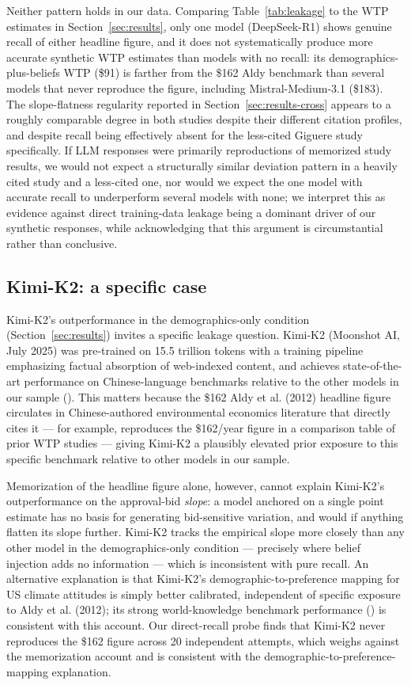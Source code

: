\documentclass[12pt]{article}
\begin{document}
Neither pattern holds in our data. Comparing Table~\ref{tab:leakage} to the WTP estimates in Section~\ref{sec:results}, only one model (DeepSeek-R1) shows genuine recall of either headline figure, and it does not systematically produce more accurate synthetic WTP estimates than models with no recall: its demographics-plus-beliefs WTP (\$91) is farther from the \$162 Aldy benchmark than several models that never reproduce the figure, including Mistral-Medium-3.1 (\$183). The slope-flatness regularity reported in Section~\ref{sec:results-cross} appears to a roughly comparable degree in both studies despite their different citation profiles, and despite recall being effectively absent for the less-cited Giguere study specifically. If LLM responses were primarily reproductions of memorized study results, we would not expect a structurally similar deviation pattern in a heavily cited study and a less-cited one, nor would we expect the one model with accurate recall to underperform several models with none; we interpret this as evidence against direct training-data leakage being a dominant driver of our synthetic responses, while acknowledging that this argument is circumstantial rather than conclusive.

\subsection{Kimi-K2: a specific case}

Kimi-K2's outperformance in the demographics-only condition (Section~\ref{sec:results}) invites a specific leakage question. Kimi-K2 (Moonshot AI, July 2025) was pre-trained on 15.5 trillion tokens with a training pipeline emphasizing factual absorption of web-indexed content, and achieves state-of-the-art performance on Chinese-language benchmarks relative to the other models in our sample (\textcite{KimiTeam2025}). This matters because the \$162 Aldy et al. (2012) headline figure circulates in Chinese-authored environmental economics literature that directly cites it --- for example, \textcite{Hao2025Shenzhen} reproduces the \$162/year figure in a comparison table of prior WTP studies --- giving Kimi-K2 a plausibly elevated prior exposure to this specific benchmark relative to other models in our sample.

Memorization of the headline figure alone, however, cannot explain Kimi-K2's outperformance on the approval-bid \emph{slope}: a model anchored on a single point estimate has no basis for generating bid-sensitive variation, and would if anything flatten its slope further. Kimi-K2 tracks the empirical slope more closely than any other model in the demographics-only condition --- precisely where belief injection adds no information --- which is inconsistent with pure recall. An alternative explanation is that Kimi-K2's demographic-to-preference mapping for US climate attitudes is simply better calibrated, independent of specific exposure to Aldy et al. (2012); its strong world-knowledge benchmark performance (\textcite{KimiTeam2025}) is consistent with this account. Our direct-recall probe finds that Kimi-K2 never reproduces the \$162 figure across 20 independent attempts, which weighs against the memorization account and is consistent with the demographic-to-preference-mapping explanation.
\end{document}
